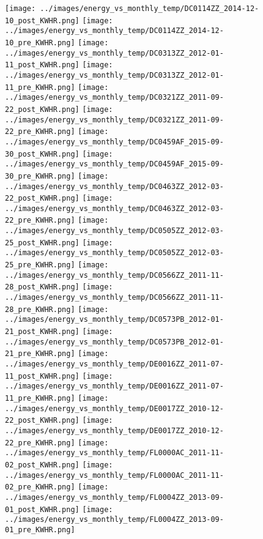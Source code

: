 \clearpage
\begin{figure}
\centering
\texttt{[image: ../images/energy\_vs\_monthly\_temp/DC0114ZZ\_2014-12-10\_post\_KWHR.png]}
\texttt{[image: ../images/energy\_vs\_monthly\_temp/DC0114ZZ\_2014-12-10\_pre\_KWHR.png]}
\texttt{[image: ../images/energy\_vs\_monthly\_temp/DC0313ZZ\_2012-01-11\_post\_KWHR.png]}
\texttt{[image: ../images/energy\_vs\_monthly\_temp/DC0313ZZ\_2012-01-11\_pre\_KWHR.png]}
\texttt{[image: ../images/energy\_vs\_monthly\_temp/DC0321ZZ\_2011-09-22\_post\_KWHR.png]}
\texttt{[image: ../images/energy\_vs\_monthly\_temp/DC0321ZZ\_2011-09-22\_pre\_KWHR.png]}
\texttt{[image: ../images/energy\_vs\_monthly\_temp/DC0459AF\_2015-09-30\_post\_KWHR.png]}
\texttt{[image: ../images/energy\_vs\_monthly\_temp/DC0459AF\_2015-09-30\_pre\_KWHR.png]}
\texttt{[image: ../images/energy\_vs\_monthly\_temp/DC0463ZZ\_2012-03-22\_post\_KWHR.png]}
\texttt{[image: ../images/energy\_vs\_monthly\_temp/DC0463ZZ\_2012-03-22\_pre\_KWHR.png]}
\texttt{[image: ../images/energy\_vs\_monthly\_temp/DC0505ZZ\_2012-03-25\_post\_KWHR.png]}
\texttt{[image: ../images/energy\_vs\_monthly\_temp/DC0505ZZ\_2012-03-25\_pre\_KWHR.png]}
\texttt{[image: ../images/energy\_vs\_monthly\_temp/DC0566ZZ\_2011-11-28\_post\_KWHR.png]}
\texttt{[image: ../images/energy\_vs\_monthly\_temp/DC0566ZZ\_2011-11-28\_pre\_KWHR.png]}
\texttt{[image: ../images/energy\_vs\_monthly\_temp/DC0573PB\_2012-01-21\_post\_KWHR.png]}
\texttt{[image: ../images/energy\_vs\_monthly\_temp/DC0573PB\_2012-01-21\_pre\_KWHR.png]}
\texttt{[image: ../images/energy\_vs\_monthly\_temp/DE0016ZZ\_2011-07-11\_post\_KWHR.png]}
\texttt{[image: ../images/energy\_vs\_monthly\_temp/DE0016ZZ\_2011-07-11\_pre\_KWHR.png]}
\texttt{[image: ../images/energy\_vs\_monthly\_temp/DE0017ZZ\_2010-12-22\_post\_KWHR.png]}
\texttt{[image: ../images/energy\_vs\_monthly\_temp/DE0017ZZ\_2010-12-22\_pre\_KWHR.png]}
\texttt{[image: ../images/energy\_vs\_monthly\_temp/FL0000AC\_2011-11-02\_post\_KWHR.png]}
\texttt{[image: ../images/energy\_vs\_monthly\_temp/FL0000AC\_2011-11-02\_pre\_KWHR.png]}
\texttt{[image: ../images/energy\_vs\_monthly\_temp/FL0004ZZ\_2013-09-01\_post\_KWHR.png]}
\texttt{[image: ../images/energy\_vs\_monthly\_temp/FL0004ZZ\_2013-09-01\_pre\_KWHR.png]}
\end{figure}
